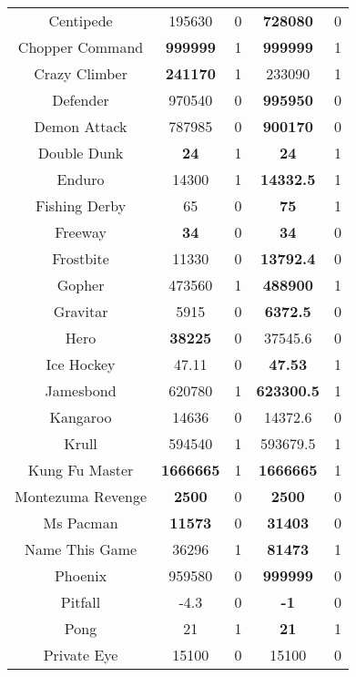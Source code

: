 \begin{table}[!hb]
\begin{center}
\begin{tabular}{c cc cc }
        Centipede &195630            & 0 & \textbf{728080} & 0 \\  
        Chopper Command &\textbf{{999999}}   & 1 & \textbf{999999} & 1 \\    
        Crazy Climber &\textbf{241170}	            & 1 & 233090 &1 \\  
        Defender &{970540}  & 0 & \textbf{995950} & 0 \\    
        Demon Attack &{787985}    & 0 & \textbf{900170} & 0 \\  
        Double Dunk &\textbf{{24 }}      & 1 & \textbf{24} & 1 \\  
        Enduro &14300            & 1 & \textbf{14332.5} & 1 \\  
        Fishing Derby &65              & 0 & \textbf{75} & 1 \\  
        Freeway &\textbf{{34}}     & 0 & \textbf{34} & 0 \\    
        Frostbite &11330	            & 0 & \textbf{13792.4} & 0 \\  
        Gopher &473560           & 1 & \textbf{488900} & 1 \\   
        Gravitar  &5915             & 0 & \textbf{6372.5} & 0 \\  
        Hero &\textbf{38225}	           & 0 & 37545.6 & 0 \\   
        Ice Hockey &47.11           & 0  & \textbf{47.53} & 1 \\  
        Jamesbond &{620780	}  & 1 & \textbf{623300.5} & 1 \\    
        Kangaroo &14636           & 0 & 14372.6 & 0 \\  
        Krull &{594540}          & 1 & 593679.5 &1 \\  
        Kung Fu Master &\textbf{{1666665}}	         & 1 & \textbf{1666665} &1 \\    
        Montezuma Revenge &\textbf{2500}            & 0 & \textbf{2500} & 0 \\  
        Ms Pacman &\textbf{11573}           & 0 & \textbf{31403} & 0 \\   
        Name This Game  &36296           & 1 & \textbf{81473} & 1\\  
        Phoenix &{959580 }        & 0 & \textbf{999999} & 0 \\  
        Pitfall  &-4.3            & 0 & \textbf{-1} & 0 \\  
        Pong &{21}     & 1 & \textbf{21} & 1 \\  
        Private Eye &15100          & 0 & 15100 & 0 \\   

\end{tabular}
\end{center}
\end{table}
